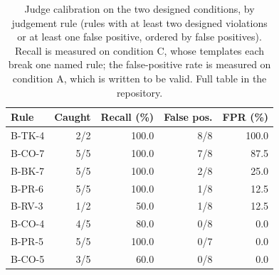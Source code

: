 \begin{table}[t]
\caption{Judge calibration on the two designed conditions, by judgement rule (rules with at least two
designed violations or at least one false positive, ordered by false positives). Recall is measured on
condition C, whose templates each break one named rule; the false-positive rate is measured on
condition A, which is written to be valid. Full table in the repository.}
\label{tab:calibration}
\centering
\footnotesize
\begin{tabular}{lrrrr}
\toprule
Rule & Caught & Recall (\%) & False pos. & FPR (\%) \\
\midrule
B-TK-4 & 2/2 & 100.0 & 8/8 & 100.0 \\
B-CO-7 & 5/5 & 100.0 & 7/8 & 87.5 \\
B-BK-7 & 5/5 & 100.0 & 2/8 & 25.0 \\
B-PR-6 & 5/5 & 100.0 & 1/8 & 12.5 \\
B-RV-3 & 1/2 & 50.0 & 1/8 & 12.5 \\
B-CO-4 & 4/5 & 80.0 & 0/8 & 0.0 \\
B-PR-5 & 5/5 & 100.0 & 0/7 & 0.0 \\
B-CO-5 & 3/5 & 60.0 & 0/8 & 0.0 \\
\bottomrule
\end{tabular}
\end{table}
